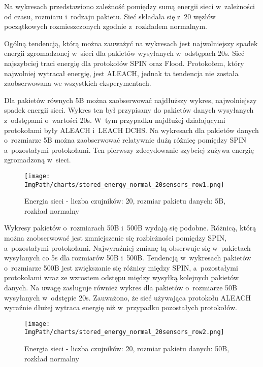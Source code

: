 Na wykresach przedstawiono zależność pomiędzy sumą energii sieci w~zależności od czasu, rozmiaru  i~rodzaju pakietu. Sieć składała się z~20 węzłów początkowych rozmieszczonych zgodnie z~rozkładem normalnym.
  
Ogólną tendencją, którą można zauważyć na wykresach jest najwolniejszy spadek energii zgromadzonej w~sieci dla pakietów wysyłanych w~odstępach 20s. Sieć najszybciej traci energię dla protokołów SPIN oraz Flood. Protokołem, który najwolniej wytracał energię, jest ALEACH, jednak ta tendencja nie została zaobserwowana we wszystkich eksperymentach.

Dla pakietów równych 5B można zaobserwować najdłuższy wykres, najwolniejszy spadek energii sieci. Wykres ten był przypisany do pakietów danych wysyłanych z~odstępami o~wartości 20s. W~tym przypadku najdłużej działającymi protokołami były ALEACH i~LEACH DCHS. Na wykresach dla pakietów danych o~rozmiarze 5B można zaobserwować relatywnie dużą różnicę pomiędzy SPIN a~pozostałymi protokołami. Ten pierwszy zdecydowanie szybciej zużywa energię zgromadzoną w~sieci.

\begin{figure}[H]
	\begin{center}
		\texttt{[image: \\ImgPath/charts/stored\_energy\_normal\_20sensors\_row1.png]}
	\end{center}
	\caption{Energia sieci - liczba czujników: 20, rozmiar pakietu danych: 5B, rozkład normalny}
\end{figure}

Wykresy pakietów o~rozmiarach 50B i~500B wydają się podobne. Różnicą, którą można zaobserwować jest zmniejszenie się rozbieżności pomiędzy SPIN, a~pozostałymi protokołami. Najwyraźniej zmianę tą obserwuje się w~pakietach wysyłanych co 5s dla rozmiarów 50B i~500B. Tendencją w~wykresach pakietów o~rozmiarze 500B jest zwiększanie się różnicy między SPIN, a~pozostałymi protokołami wraz ze wzrostem odstępu między wysyłką kolejnych pakietów danych. Na uwagę zasługuje również wykres dla pakietów o~rozmiarze 50B wysyłanych w~odstępie 20s. Zauważono, że sieć używająca protokołu ALEACH wyraźnie dłużej wytraca energię niż w~przypadku pozostałych protokołów. 

\begin{figure}[H]
	\begin{center}
		\texttt{[image: \\ImgPath/charts/stored\_energy\_normal\_20sensors\_row2.png]}
	\end{center}
	\caption{Energia sieci - liczba czujników: 20, rozmiar pakietu danych: 50B, rozkład normalny}
\end{figure}

